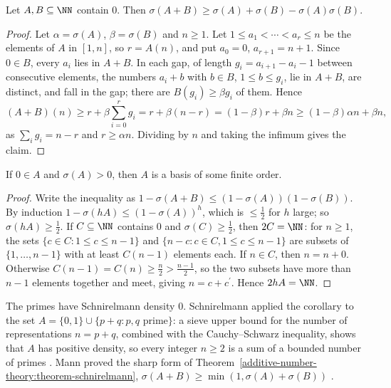 \begin{theorem}[Schnirelmann]\label{additive-number-theory:theorem-schnirelmann}
Let $A, B \subseteq \NN$ contain $0$. Then $\sigma(A + B) \geq \sigma(A) + \sigma(B) - \sigma(A)\sigma(B)$.
\end{theorem}

\begin{proof}
Let $\alpha = \sigma(A)$, $\beta = \sigma(B)$ and $n \geq 1$. Let $1 \leq a_1 < \cdots < a_r \leq n$ be the elements of $A$ in $[1, n]$, so $r = A(n)$, and put $a_0 = 0$, $a_{r+1} = n + 1$. Since $0 \in B$, every
$a_i$ lies in $A + B$. In each gap, of length $g_i = a_{i+1} - a_i - 1$ between consecutive elements, the numbers $a_i + b$ with $b \in B$, $1 \leq b \leq g_i$, lie in $A + B$, are distinct, and fall in the gap; there
are $B(g_i) \geq \beta g_i$ of them. Hence
\[
(A + B)(n) \geq r + \beta\sum_{i=0}^rg_i = r + \beta(n - r) = (1 - \beta)r + \beta n \geq (1 - \beta)\alpha n + \beta n,
\]
as $\sum_ig_i = n - r$ and $r \geq \alpha n$. Dividing by $n$ and taking the infimum gives the claim.
\end{proof}

\begin{corollary}\label{additive-number-theory:corollary-schnirelmann-basis}
If $0 \in A$ and $\sigma(A) > 0$, then $A$ is a basis of some finite order.
\end{corollary}

\begin{proof}
Write the inequality as $1 - \sigma(A + B) \leq (1 - \sigma(A))(1 - \sigma(B))$. By induction $1 - \sigma(hA) \leq (1 - \sigma(A))^h$, which is $\leq \frac12$ for $h$ large; so $\sigma(hA) \geq \frac12$. If $C \subseteq \NN$ contains $0$
and $\sigma(C) \geq \frac12$, then $2C = \NN$: for $n \geq 1$, the sets $\{c \in C : 1 \leq c \leq n - 1\}$ and $\{n - c : c \in C, 1 \leq c \leq n - 1\}$ are subsets of $\{1, \ldots, n - 1\}$ with at least
$C(n - 1)$ elements each. If $n \in C$, then $n = n + 0$. Otherwise $C(n - 1) = C(n) \geq \frac n2 > \frac{n - 1}{2}$, so the two subsets have more than $n - 1$ elements together and meet, giving $n = c + c^{\prime}$. Hence $2hA = \NN$.
\end{proof}

\begin{remark}\label{additive-number-theory:remark-schnirelmann-primes}
The primes have Schnirelmann density $0$. Schnirelmann applied the corollary to the set $A = \{0, 1\} \cup \{p + q : p, q \text{ prime}\}$: a sieve upper bound for the number of representations $n = p + q$,
combined with the Cauchy--Schwarz inequality, shows that $A$ has positive density, so every integer $n \geq 2$ is a sum of a bounded number of primes \cite{nathanson-additive}. Mann proved the sharp form of
Theorem~\ref{additive-number-theory:theorem-schnirelmann}, $\sigma(A + B) \geq \min(1, \sigma(A) + \sigma(B))$ \cite{mann-1942}.
\end{remark}

